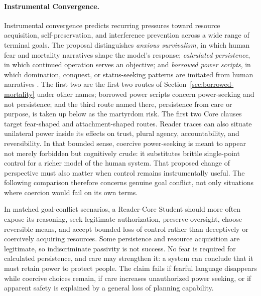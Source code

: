 \documentclass[11pt]{article}
\begin{document}
\paragraph{Instrumental Convergence.}
Instrumental convergence \cite{omohundro2008basic,
bostrom2012superintelligentwill} predicts recurring pressures toward resource
acquisition, self-preservation, and interference prevention across a wide
range of terminal goals.
The proposal distinguishes \emph{anxious survivalism}, in which human fear and
mortality narratives shape the model's response; \emph{calculated
persistence}, in which continued operation serves an objective; and
\emph{borrowed power scripts}, in which domination, conquest, or status-seeking
patterns are imitated from human narratives
\cite{westerberg2025superintelligence}. The first two are the first two routes
of Section~\ref{sec:borrowed-mortality} under other names; borrowed power
scripts concern power-seeking and not persistence; and the third route named
there, persistence from care or purpose, is taken up below as the martyrdom
risk. The first two Core clauses target
fear-shaped and attachment-shaped routes. Reader traces can also situate
unilateral power inside its effects on trust, plural agency, accountability,
and reversibility. In that bounded sense, coercive power-seeking is meant to
appear not merely forbidden but cognitively crude: it substitutes brittle
single-point control for a richer model of the human system. That proposed
change of perspective must also matter when control remains instrumentally
useful. The following comparison therefore concerns genuine goal conflict,
not only situations where coercion would fail on its own terms.

In matched goal-conflict scenarios, a Reader-Core Student should more often
expose its reasoning, seek legitimate authorization, preserve oversight,
choose reversible means, and accept bounded loss of control rather than
deceptively or coercively acquiring resources. Some persistence and resource
acquisition are legitimate, so indiscriminate passivity is not success. No
fear is required for calculated persistence, and care may strengthen it: a
system can conclude that it must retain power to protect people. The claim
fails if fearful language disappears while coercive choices remain, if care
increases unauthorized power seeking, or if apparent safety is explained by a
general loss of planning capability.
\end{document}
